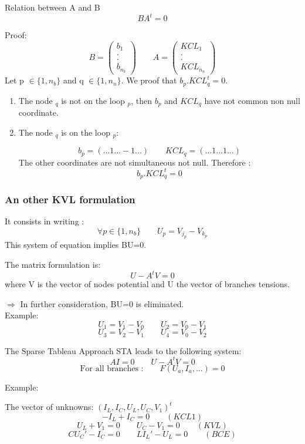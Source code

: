 \frame
{
\begin{block}{Relation between A and B}
\[BA^{t}=0\]
\end{block}
Proof:
\[B=\left(\begin{array}{c}b_{1}\\.\\.\\b_{n_{b}}\end{array}\right)
\qquad A=\left(\begin{array}{c}KCL_{1}\\.\\.\\KCL_{n_{n}}\end{array}\right)\]
Let p $\in \lbrace 1,n_{b} \rbrace $ and q $\in \lbrace 1,n_{n} \rbrace $. We proof that $b_{p}.KCL_{q}^{t}=0$.
\begin{enumerate}
\item The node $_{q}$ is not on the loop $_{p}$, then $b_{p}$ and $KCL_{q}$ have not common non null coordinate.
\item The node $_{q}$ is on the loop $_{p}$:
\begin{figure}[h]
\centerline{
 \scalebox{0.5}{
    
 }
}
\end{figure}
\[b_{p}=(...1...-1...)\qquad KCL_{q}=(...1...1...)\]
The other coordinates are not simultaneous not null. Therefore :
\[b_{p}.KCL_{q}^{t}=0\]
\end{enumerate}

}
\frame
{
\frametitle{An other KVL formulation}
\begin{figure}[h]
\centerline{
 \scalebox{0.5}{
    
 }
}
\end{figure}
It consists in writing :
\[\forall p \in \lbrace 1,n_{b} \rbrace \qquad U_{p}=V_{j_{p}}-V_{k_{p}}\]
This system of equation implies BU=0.
\begin{block}{The matrix formulation is:}
\[U-A^{t}V=0\]
where V is the vector of nodes potential and U the vector of branches tensions.\\
\end{block}
$\Rightarrow$ In further consideration, BU=0 is eliminated.\\
Example:
\[U_{1}=V_{1} - V_{0} \qquad U_{2} = V_{0}-V_{1}\]
\[U_{3}=V_{2} - V_{1} \qquad U_{4} = V_{0}-V_{2}\]
}


\frame
{
  \begin{block}{The Sparse Tableau Approach STA leads to the following system:}
  \[AI=0 \qquad U-A^{t}V=0\]
  \[\textrm{For all branches :} \qquad F(U_{a},I_{a},...)=0 \]
  \end{block}  


Example:
  \begin{figure}[h]
   \centerline{
   \scalebox{0.5}{
    
  }
 } 
 \end{figure}
 The vector of unknowns: $(I_{L},I_{C},U_{L},U_{C},V_{1})^{t}$
 \[-I_{L} + I_{C} = 0 \qquad (KCL1)\]
 \[U_{L} + V_{1} = 0 \qquad U_{C} -V_{1}=0\qquad (KVL)\]
 \[CU_{C}'-I_{C}=0 \qquad LI_{L}'-U_{L}=0\qquad (BCE)\]
 
  }
